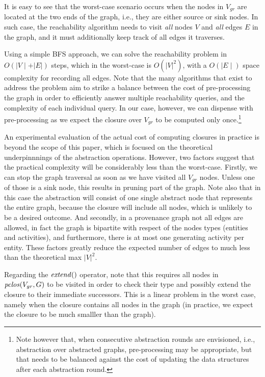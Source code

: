 It is easy to see that the worst-case scenario occurs when the nodes in $V_{gr}$ are located at the two ends of the graph, i.e., they are either source or sink nodes.
In such case, the reachability algorithm needs to visit \textit{all} nodes $V$ and \textit{all} edges $E$ in the graph, and it must additionally keep track of all edges it traverses.

Using a simple BFS approach,  we can solve the reachability problem in $O(\mid V\mid + |E|)$ steps, which in the worst-case is $O(|V|^2)$, with a $O(\mid E\mid)$ space complexity for recording all edges. 
Note that the many algorithms that exist to address the problem aim to strike a balance between the cost of pre-processing the graph in order to efficiently answer multiple reachability queries, and the complexity of each individual query.
In our case, however, we can dispense with pre-processing as we expect the closure over $V_{gr}$ to be computed only once.\footnote{Note however that, when consecutive abstraction rounds are envisioned, i.e., abstraction over abstracted graphs, pre-processing may be appropriate, but that needs to be balanced against the cost of updating the data structures after each abstraction round.}

An experimental evaluation of the actual cost of computing closures in practice is beyond the scope of this paper, which is focused on the theoretical underpinnnings of the abstraction operations.
However, two factors suggest that the practical complexity will be considerably less than the worst-case.
Firstly, we can stop the graph traversal as soon as we have visited all $V_{gr}$ nodes. Unless one of those is a sink node, this results in pruning part of the graph. 
Note also that in this case the abstraction will consist of one single abstract node that represents the entire graph, because the closure will include all nodes, which is unlikely to be a desired outcome.
And secondly, in a provenance graph not all edges are allowed, in fact the graph is bipartite with respect of the nodes types (entities and activities), and furthermore, there is at most one generating activity per entity. These factors greatly reduce the expected number of edges to much less than the theoretical max $|V|^2$.

Regarding the $\mathit{extend}()$ operator, note that this requires all nodes in $\mathit{pclos}(V_{gr}, G)$ to be visited in order to check their type and possibly extend the closure to their immediate successors. 
This is a linear problem in the worst case, namely when the closure contains all nodes in the graph (in practice, we expect the closure to be much smalller than the graph).


